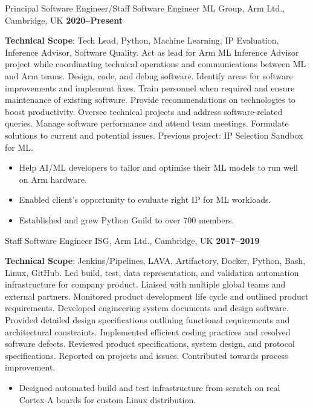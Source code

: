 \documentclass[10pt,a4paper,sans]{moderncv}
\begin{document}
\cventry{}
    {Principal Software Engineer/Staff Software Engineer}
    {ML Group, Arm Ltd., Cambridge, UK}
    {\textbf{2020--Present}}
    {}
    {\textbf{Technical Scope}: Tech Lead, Python, Machine Learning, IP
    Evaluation, Inference Advisor, Software Quality.\newline
    Act as lead for Arm ML Inference Advisor project while
    coordinating technical operations and communications between ML and Arm
    teams. Design, code, and debug software. Identify areas for software
    improvements and implement fixes.
    Train personnel when required and ensure maintenance of existing
    software. Provide recommendations on technologies to boost productivity.
    Oversee technical projects and address software-related queries. Manage
    software performance and attend team meetings. Formulate solutions to
    current and potential issues.
    Previous project: IP Selection Sandbox for ML\@.
    \begin{itemize}
        \item Help AI/ML developers to tailor and optimise their ML models to
            run well on Arm hardware.
        \item Enabled client’s opportunity to evaluate right IP for ML
            workloads.
        \item Established and grew Python Guild to over 700 members.
    \end{itemize}}

\cventry{}
    {Staff Software Engineer}
    {ISG, Arm Ltd., Cambridge, UK}
    {\textbf{2017--2019}}
    {}
    {\textbf{Technical Scope}: Jenkins/Pipelines, LAVA, Artifactory, Docker,
    Python, Bash, Linux, GitHub.\newline
    Led build, test, data representation, and validation automation
    infrastructure for company product. Liaised with multiple global teams and
    external partners. Monitored product development life cycle and outlined
    product requirements. Developed engineering system documents and design
    software. Provided detailed design specifications outlining functional
    requirements and architectural constraints. Implemented efficient coding
    practices and resolved software defects. Reviewed product specifications,
    system design, and protocol specifications. Reported on projects and
    issues. Contributed towards process improvement.
    \begin{itemize}
        \item Designed automated build and test infrastructure from scratch on
            real Cortex-A boards for custom Linux distribution.
    \end{itemize}}
\end{document}
